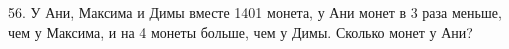 56. У Ани, Максима и Димы вместе 1401 монета, у Ани монет в 3 раза меньше, чем у Максима, и на 4 монеты больше, чем у Димы. Сколько монет у Ани?\\
